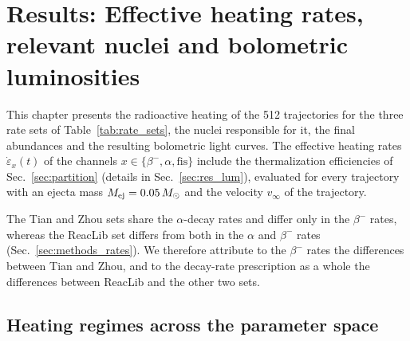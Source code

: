 \chapter{Results: Effective heating rates, relevant nuclei and bolometric luminosities}\label{Results}\label{ch:results}

This chapter presents the radioactive heating of the 512 trajectories for the three rate sets of Table~\ref{tab:rate_sets}, the nuclei responsible for it, the final abundances and the resulting bolometric light curves.
The effective heating rates $\dot\varepsilon_x(t)$ of the channels $x\in\{\beta^-,\alpha,\mathrm{fis}\}$ include the thermalization efficiencies of Sec.~\ref{sec:partition} (details in Sec.~\ref{sec:res_lum}), evaluated for every trajectory with an ejecta mass $M_{\rm ej}=0.05\,M_\odot$ and the velocity $v_\infty$ of the trajectory.

The Tian and Zhou sets share the $\alpha$-decay rates and differ only in the $\beta^-$ rates, whereas the ReacLib set differs from both in the $\alpha$ and $\beta^{-}$ rates (Sec.~\ref{sec:methods_rates}).
We therefore attribute to the $\beta^-$ rates the differences between Tian and Zhou, and to the decay-rate prescription as a whole the differences between ReacLib and the other two sets.

\section{Heating regimes across the parameter space}\label{sec:res_classes}

